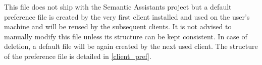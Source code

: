 This file does not ship with the Semantic Assistants project but a default preference file is created by the very first client installed and used on the user's machine and will be reused by the subsequent clients. It is not advised to manually modify this file unless its structure can be kept consistent. In case of deletion, a default file will be again created by the next used client. The structure of the preference file is detailed in \ref{client_pref}.